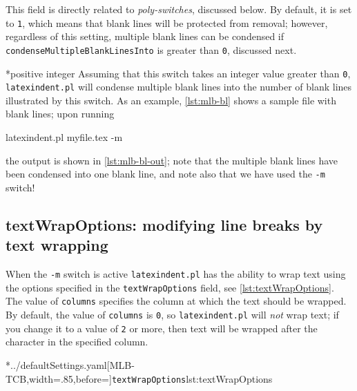 	This field is directly related to \emph{poly-switches}, discussed below. By
	default, it is set to \texttt{1}, which means that blank lines will be
	protected from removal; however, regardless of this setting, multiple blank lines can be
	condensed if \texttt{condenseMultipleBlankLinesInto} is greater than \texttt{0},
	discussed next.

*{positive integer}
	Assuming that this switch takes an integer value greater than
	\texttt{0}, \texttt{latexindent.pl} will condense multiple blank
	lines into the number of blank lines illustrated by this switch. As an example,
	\cref{lst:mlb-bl} shows a sample file with blank lines; upon running
	\begin{commandshell}
latexindent.pl myfile.tex -m  
\end{commandshell}
	the output is shown in \cref{lst:mlb-bl-out}; note that the multiple blank lines
	have been condensed into one blank line, and note also that we have used the
	\texttt{-m} switch!

	\begin{minipage}{.45\textwidth}
	\end{minipage}%
	\hfill
	\begin{minipage}{.45\textwidth}
	\end{minipage}

\subsection{textWrapOptions: modifying line breaks by text wrapping}\label{subsec:textwrapping}
	When the \texttt{-m} switch is active \texttt{latexindent.pl} has the
	ability to wrap text using the options%
	 specified in the \texttt{textWrapOptions} field, see
	\cref{lst:textWrapOptions}. The value of \texttt{columns} specifies the
	column at which the text should be wrapped. By default, the value of
	\texttt{columns} is \texttt{0}, so
	\texttt{latexindent.pl} will \emph{not} wrap text; if you change it
	to a value of \texttt{2} or more, then text will be wrapped after the
	character in the specified column.

	\cmhlistingsfromfile[style=textWrapOptions]*{../defaultSettings.yaml}[MLB-TCB,width=.85\linewidth,before=\centering]{\texttt{textWrapOptions}}{lst:textWrapOptions}

